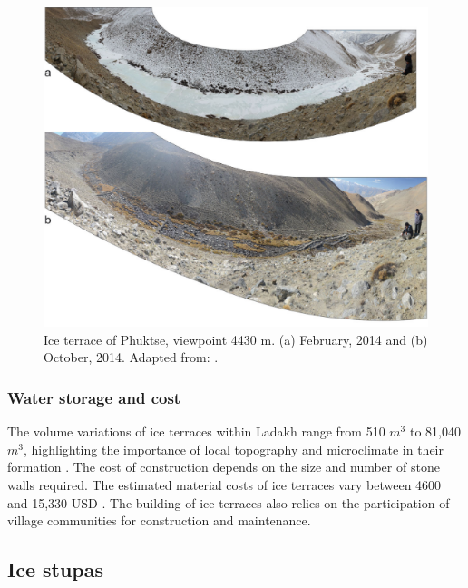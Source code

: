 \begin{figure}[htb]
	\centering
	\includegraphics[width=\textwidth]{figs/IT_example.png}
	\caption{Ice terrace of Phuktse, viewpoint 4430 m. (a) February, 2014 and (b) October, 2014. Adapted from:
		\citet{nusserSociohydrologyArtificialGlaciers2019}.}
	\label{fig:ITexample}
\end{figure}

\subsubsection{Water storage and cost}

The volume variations of ice terraces within Ladakh range from 510 $m^3$ to 81,040 $m^3$, highlighting
the importance of local topography and microclimate in their formation
\citep{nusserSociohydrologyArtificialGlaciers2019, norphelSnowWaterHarvesting2015}. The cost of construction
depends on the size and number of stone walls required. The estimated material costs of ice terraces vary between
4600 and 15,330 USD \citep{nusserSociohydrologyArtificialGlaciers2019}. The building of ice terraces also relies
on the participation of village communities for construction and maintenance.

\subsection{Ice stupas}

